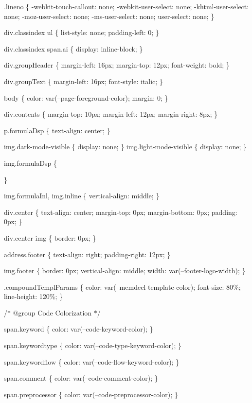 .lineno \{ -\/webkit-\/touch-\/callout\+: none; -\/webkit-\/user-\/select\+: none; -\/khtml-\/user-\/select\+: none; -\/moz-\/user-\/select\+: none; -\/ms-\/user-\/select\+: none; user-\/select\+: none; \}

div.\+classindex ul \{ list-\/style\+: none; padding-\/left\+: 0; \}

div.\+classindex span.\+ai \{ display\+: inline-\/block; \}

div.\+group\+Header \{ margin-\/left\+: 16px; margin-\/top\+: 12px; font-\/weight\+: bold; \}

div.\+group\+Text \{ margin-\/left\+: 16px; font-\/style\+: italic; \}

body \{ color\+: var(--page-\/foreground-\/color); margin\+: 0; \}

div.\+contents \{ margin-\/top\+: 10px; margin-\/left\+: 12px; margin-\/right\+: 8px; \}

p.\+formula\+Dsp \{ text-\/align\+: center; \}

img.\+dark-\/mode-\/visible \{ display\+: none; \} img.\+light-\/mode-\/visible \{ display\+: none; \}

img.\+formula\+Dsp \{

\}

img.\+formula\+Inl, img.\+inline \{ vertical-\/align\+: middle; \}

div.\+center \{ text-\/align\+: center; margin-\/top\+: 0px; margin-\/bottom\+: 0px; padding\+: 0px; \}

div.\+center img \{ border\+: 0px; \}

address.\+footer \{ text-\/align\+: right; padding-\/right\+: 12px; \}

img.\+footer \{ border\+: 0px; vertical-\/align\+: middle; width\+: var(--footer-\/logo-\/width); \}

.compound\+Templ\+Params \{ color\+: var(--memdecl-\/template-\/color); font-\/size\+: 80\%; line-\/height\+: 120\%; \}

/\texorpdfstring{$\ast$}{*} @group Code Colorization \texorpdfstring{$\ast$}{*}/

span.\+keyword \{ color\+: var(--code-\/keyword-\/color); \}

span.\+keywordtype \{ color\+: var(--code-\/type-\/keyword-\/color); \}

span.\+keywordflow \{ color\+: var(--code-\/flow-\/keyword-\/color); \}

span.\+comment \{ color\+: var(--code-\/comment-\/color); \}

span.\+preprocessor \{ color\+: var(--code-\/preprocessor-\/color); \}

